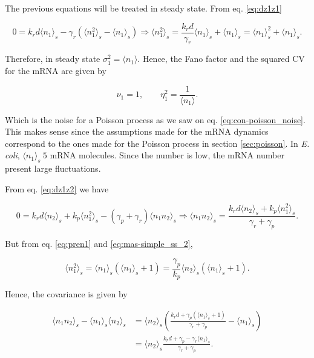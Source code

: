 The previous equations will be treated in steady state. From  eq. \eqref{eq:dz1z1}

\begin{equation}
  \label{eq:pren1}
  0 = k_rd \langle n_1 \rangle_s -\gamma_r \left(\langle n_1^2 \rangle_s - \langle n_1 \rangle_s \right) \Rightarrow \langle n_1^2 \rangle_s = \frac{k_rd}{\gamma_r}\langle n_1 \rangle_s + \langle n_1 \rangle_s = \langle n_1 \rangle_s^2 + \langle n_1 \rangle_s.
\end{equation}

Therefore, in steady state $\sigma_1^2 = \langle n_1 \rangle$. Hence, the Fano factor and the squared CV for the mRNA are given by

\begin{equation}
  \label{noise1}
  \nu_1 = 1, \quad\quad \eta_1^2 = \frac{1}{\langle n_1 \rangle}.
\end{equation}

Which is the noise for a Poisson process as we saw on eq. \eqref{eq:con-poisson_noise}. This makes sense since the assumptions made for the mRNA dynamics correspond to the ones made for the Poisson process in section \ref{sec:poisson}. In \textit{E. coli}, $\langle n_1\rangle_s ~ 5$ mRNA molecules. Since the number is low, the mRNA number present large fluctuations.

From eq. \eqref{eq:dz1z2} we have

\begin{equation*}
  0 = k_rd \langle n_2 \rangle_s + k_p \langle n_1^2 \rangle_s - (\gamma_p + \gamma_r) \langle n_1n_2 \rangle_s \Rightarrow \langle n_1n_2 \rangle_s  = \frac{k_rd\langle n_2\rangle_s+k_p\langle n_1^2\rangle_s}{\gamma_r+\gamma_p}.
\end{equation*}

But from eq. \eqref{eq:pren1} and \eqref{eq:mas-simple_ss_2},

\begin{equation}
\langle n_1^2 \rangle_s = \langle n_1 \rangle_s\left( \langle n_1 \rangle_s+1\right) = \frac{\gamma_p}{k_p}\langle n_2 \rangle_s\left(\langle n_1\rangle_s + 1\right).
\end{equation}

Hence, the covariance is given by

\begin{align*}
  \langle n_1n_2 \rangle_s - \langle n_1 \rangle_s\langle n_2\rangle_s &= \langle n_2 \rangle_s \left(\frac{k_rd+\gamma_p\left(\langle n_1\rangle_s+1\right)}{\gamma_r+\gamma_p}-\langle n_1\rangle_s\right)\\
  &=\langle n_2\rangle_s\frac{k_rd+\gamma_p-\gamma_r\langle n_1\rangle_s}{\gamma_r+\gamma_p}.
\end{align*}

